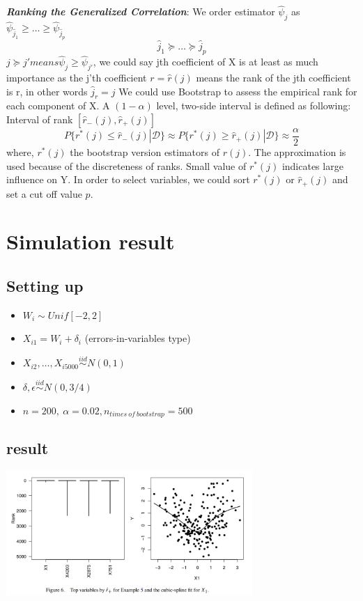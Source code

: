 \documentclass[paper=a4, fontsize=12pt]{scrartcl}
\numberwithin{equation}{section}
\numberwithin{figure}{section}
\numberwithin{table}{section}
\begin{document}
\textit{\textbf{Ranking the Generalized Correlation}}: We order estimator $\hat{\psi}_j$ as $\hat{\psi}_{\hat{j}_1} \geq \dots \geq \hat{\psi}_{\hat{j}_p}$
 \[ \hat{j}_1 \succeq \dots \succeq \hat{j}_p\]
  $j \succeq j' means \hat{\psi}_j \geq \hat{\psi}_{j'}$, we could
  say jth coefficient of X is at least as much importance as the j'th
  coefficient
  $r = \hat{r}(j)$ means the rank of the jth coefficient is r, in
  other words $\hat{j}_r = j$
We could use Bootstrap to assess the empirical rank for each component
of X. A $(1-\alpha)$ level, two-side interval is defined as following: Interval of rank $[\hat{r}_{-}(j), \hat{r}_{+}(j)]$
\[
  P\{r^*(j)\leq \hat{r}_{-}(j)|\mathcal{D}\} \approx P\{r^*(j)\geq \hat{r}_{+}(j)|\mathcal{D}\} \approx \frac{\alpha}{2}
\]
 where, $r^*(j)$ the bootstrap version estimators of $r(j)$. The approximation is used because of the discreteness of ranks. Small value of $r^*(j)$ indicates large influence on Y. In order to select variables, we could sort $r^*(j)$ or $\hat{r}_{+}(j)$ and set a cut off value $p$.
 
\section{Simulation result}
\subsection{Setting up}

\begin{itemize}
\item $W_i \sim Unif[-2,2]$
\item
  $X_{i1} = W_{i} + \delta_i$ (errors-in-variables type)
\item
  $X_{i2}, \dots, X_{i5000} \stackrel{iid}{\sim} N(0,1)$
\item
  $\delta, \epsilon \stackrel{iid}{\sim} N(0, 3/4)$
\item
  $n = 200, ~ \alpha = 0.02, n_{times ~of ~bootstrap} = 500$
\end{itemize}
\subsection{result}

\begin{center}

\includegraphics[width=0.70000\textwidth]{../figure/sim_non_linear.png}

\end{center}
\end{document}
